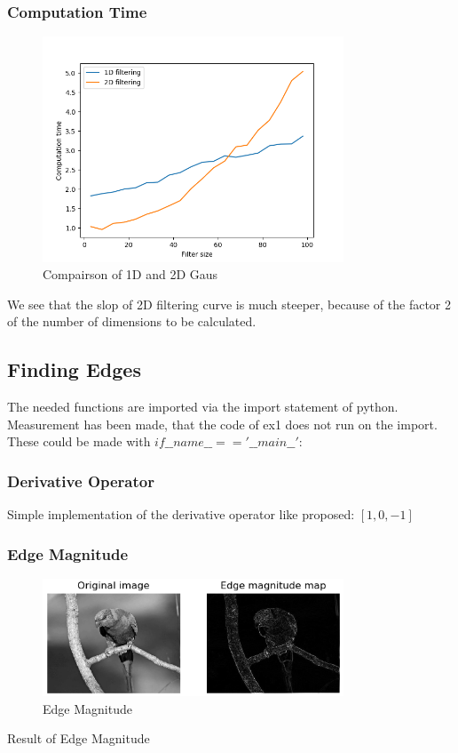 \documentclass[12pt]{article}
\begin{document}
\subsubsection{Computation Time}
\begin{figure}[!htb]
  \centering
  \includegraphics[width=0.8\textwidth]{pics/1_8_s}
  \caption{Compairson of 1D and 2D Gaus}
\end{figure}
We see that the slop of 2D filtering curve is much steeper, because of the factor 2 of
the number of dimensions to be calculated.
\newpage
\subsection{Finding Edges}
The needed functions are imported via the import statement of python. Measurement has been made,
that the code of ex1 does not run on the import. These could be made with $if \_\_name\_\_ == '\_\_main\_\_':$

\subsubsection{Derivative Operator}
Simple implementation of the derivative operator like proposed: $[1, 0, -1]$
\subsubsection{Edge Magnitude}
\begin{figure}[!htb]
  \centering
  \includegraphics[width=0.8\textwidth]{pics/2_2_s}
  \caption{Edge Magnitude}
\end{figure}
Result of Edge Magnitude
\end{document}
